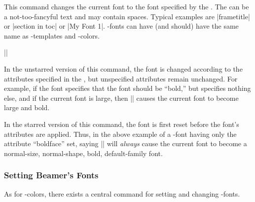 \begin{command}{\usebeamerfont\opt{|*|}}
  This command changes the current font to the font specified by the
  . The  can be a
  not-too-fancyful text and may contain spaces. Typical examples are
  |frametitle| or |section in toc| or |My Font 1|. \beamer-fonts can
  have (and should) have the same name as \beamer-templates and
  \beamer-colors.

  \example ||

  In the unstarred version of this command, the font is changed
  according to the attributes specified in the , but unspecified attributes remain unchanged. For example, if
  the font specifies that the font should be ``bold,'' but specifies
  nothing else, and if the current font is large, then
  |\usebeamerfont| causes the current font to become large and
  bold.

  In the starred version of this command, the font is first reset
  before the font's attributes are applied. Thus, in the above example
  of a \beamer-font having only the attribute ``boldface'' set, saying
  |\usebeamerfont*| will \emph{always} cause the current font to
  become a normal-size, normal-shape, bold, default-family font.
\end{command}


\subsubsection{Setting Beamer's Fonts}

As for \beamer-colors, there exists a central command for setting and
changing \beamer-fonts.

